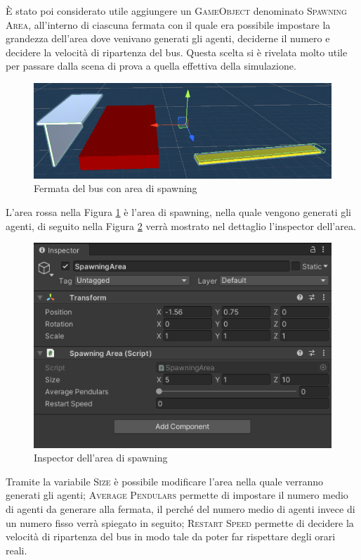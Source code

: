 \documentclass[12pt, openany]{book}
\begin{document}
	 È stato poi considerato utile aggiungere un \textsc{GameObject} denominato \textsc{Spawning Area}, all'interno di ciascuna fermata con il quale era possibile impostare la grandezza dell'area dove venivano generati gli agenti, deciderne il numero e decidere la velocità di ripartenza del bus. Questa scelta si è rivelata molto utile per passare dalla scena di prova a quella effettiva della simulazione.
	 \begin{figure}[H]
	 	\centering
	 	\includegraphics[width=1\linewidth]{"Immagini/BusStopSA.png"}
	 	\caption{Fermata del bus con area di spawning}
	 	\label{fig:BusStopSA}
	 \end{figure}
 	L'area rossa nella Figura \ref{fig:BusStopSA} è l'area di spawning, nella quale vengono generati gli agenti, di seguito nella Figura \ref{fig:SAInspector} verrà mostrato nel dettaglio l'inspector dell'area.
 	\begin{figure}[H]
 		\centering
 		\includegraphics[width=1\linewidth]{"Immagini/SAInspector.png"}
 		\caption{Inspector dell'area di spawning}
 		\label{fig:SAInspector}
 	\end{figure}
 	Tramite la variabile \textsc{Size} è possibile modificare l'area nella quale verranno generati gli agenti; \textsc{Average Pendulars} permette di impostare il numero medio di agenti da generare alla fermata, il perché del numero medio di agenti invece di un numero fisso verrà spiegato in seguito; \textsc{Restart Speed} permette di decidere la velocità di ripartenza del bus in modo tale da poter far rispettare degli orari reali.  
\end{document}
